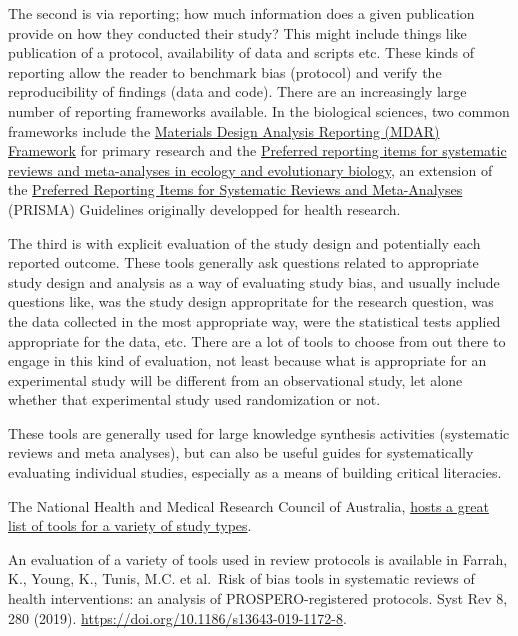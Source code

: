 \documentclass[
]{book}
\begin{document}
The second is via reporting; how much information does a given publication provide on how they conducted their study? This might include things like publication of a protocol, availability of data and scripts etc. These kinds of reporting allow the reader to benchmark bias (protocol) and verify the reproducibility of findings (data and code). There are an increasingly large number of reporting frameworks available. In the biological sciences, two common frameworks include the \href{https://doi.org/10.1073/pnas.2103238118}{Materials Design Analysis Reporting (MDAR) Framework} for primary research and the \href{https://doi.org/10.1111/brv.12721}{Preferred reporting items for systematic reviews and meta-analyses in ecology and evolutionary biology}, an extension of the \href{https://www.prisma-statement.org/}{Preferred Reporting Items for Systematic Reviews and Meta-Analyses} (PRISMA) Guidelines originally developped for health research.

The third is with explicit evaluation of the study design and potentially each reported outcome. These tools generally ask questions related to appropriate study design and analysis as a way of evaluating study bias, and usually include questions like, was the study design appropritate for the research question, was the data collected in the most appropriate way, were the statistical tests applied appropriate for the data, etc. There are a lot of tools to choose from out there to engage in this kind of evaluation, not least because what is appropriate for an experimental study will be different from an observational study, let alone whether that experimental study used randomization or not.

These tools are generally used for large knowledge synthesis activities (systematic reviews and meta analyses), but can also be useful guides for systematically evaluating individual studies, especially as a means of building critical literacies.

The National Health and Medical Research Council of Australia, \href{https://www.nhmrc.gov.au/guidelinesforguidelines/develop/assessing-risk-bias}{hosts a great list of tools for a variety of study types}.

An evaluation of a variety of tools used in review protocols is available in Farrah, K., Young, K., Tunis, M.C. et al.~Risk of bias tools in systematic reviews of health interventions: an analysis of PROSPERO-registered protocols. Syst Rev 8, 280 (2019). \url{https://doi.org/10.1186/s13643-019-1172-8}.
\end{document}

